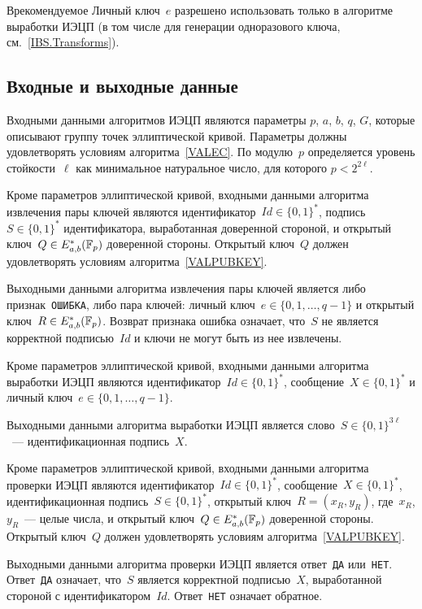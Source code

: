 \begin{appendix}{В}{рекомендуемое}
Личный ключ~$e$ разрешено использовать только 
в алгоритме выработки ИЭЦП
(в том числе для генерации одноразового ключа, 
см.~\ref{IBS.Transforms}).

\label{IBS.Algs}

\subsection{Входные и выходные данные}

Входными данными алгоритмов ИЭЦП являются 
параметры $p$, $a$, $b$, $q$, $G$, которые описывают группу 
точек эллиптической кривой.
Параметры должны удовлетворять условиям алгоритма~\ref{VALEC}. 
По модулю~$p$ определяется уровень стойкости~$\ell$ как минимальное 
натуральное число, для которого $p<2^{2\ell}$.

Кроме параметров эллиптической кривой,
входными данными алгоритма извлечения пары ключей
являются идентификатор~$Id\in\{0,1\}^*$,
подпись~$S\in\{0,1\}^*$ идентификатора, 
выработанная доверенной стороной, 
и открытый ключ~$Q\in E_{a,b}^*(\mathbb{F}_p)$ доверенной стороны.
%
Открытый ключ~$Q$ должен удовлетворять условиям
алгоритма~\ref{VALPUBKEY}.

Выходными данными алгоритма извлечения пары ключей
является либо признак~\texttt{ОШИБКА}, либо пара ключей:
личный ключ~$e\in\{0,1,\ldots,q-1\}$ и 
открытый ключ~$R\in E_{a,b}^*(\mathbb{F}_p)$.
%
Возврат признака ошибка означает, что~$S$ 
не является корректной подписью~$Id$ и ключи 
не могут быть из нее извлечены.

Кроме параметров эллиптической кривой,
входными данными алгоритма выработки ИЭЦП
являются 
идентификатор~$Id\in\{0,1\}^*$,
сообщение~$X\in\{0,1\}^*$
и личный ключ~$e\in\{0,1,\ldots,q-1\}$.

Выходными данными алгоритма выработки ИЭЦП
является слово~$S\in\{0,1\}^{3\ell}$~--- 
идентификационная подпись~$X$.

Кроме параметров эллиптической кривой,
входными данными алгоритма проверки ИЭЦП
являются идентификатор~$Id\in\{0,1\}^*$, 
сообщение~$X\in\{0,1\}^*$,
идентификационная подпись~$S\in\{0,1\}^*$, 
открытый ключ~$R=(x_R,y_R)$, где~$x_R$, $y_R$~--- целые числа, 
и открытый ключ~$Q\in E_{a,b}^*(\mathbb{F}_p)$ доверенной стороны.
%
Открытый ключ~$Q$ должен удовлетворять условиям
алгоритма~\ref{VALPUBKEY}.

Выходными данными алгоритма проверки ИЭЦП
является ответ~\texttt{ДА} или~\texttt{НЕТ}.
Ответ~\texttt{ДА} означает, что~$S$ 
является корректной подписью~$X$,
выработанной стороной с идентификатором~$Id$.
Ответ~\texttt{НЕТ} означает обратное.


\end{appendix}
